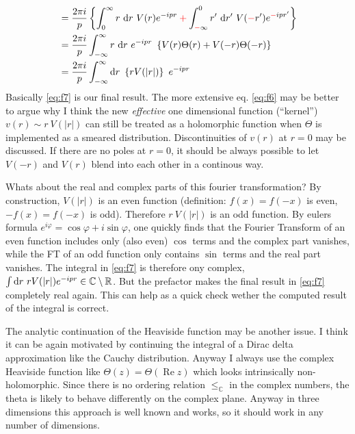 \documentclass[10pt,a4paper]{article}
\begin{document}
\begin{appendices}
\begin{subequations}
\begin{align}
&= \frac{2\pi i}p \left\{ \int_0^\infty r~\d r~V(r) e^{-ipr} \redplus \int_{\redmin \infty}^0 r'~\d r'~V(\redmin r') e^{\redmin i p r'} \right\}  \label{eq:f5} \\
&= \frac{2\pi i}p \int_{-\infty}^\infty r~\d r~ e^{-ipr}~
\left\{ V(r) \Theta(r) + V(-r) \Theta(-r) \right\} \label{eq:f6} \\
&= \frac{2\pi i}p \int_{-\infty}^\infty \d r~ \left\{ r V(|r|) \right\}~e^{-ipr} \label{eq:f7}
\end{align}
\end{subequations}
Basically \eqref{eq:f7} is our final result. The more extensive eq. \eqref{eq:f6} may be better to argue why I think the new {\it effective} one dimensional function (``kernel'') $v(r)\sim r~V(|r|)$ can still be treated as a holomorphic function when $\Theta$ is implemented as a smeared distribution. Discontinuities of $v(r)$ at $r=0$ may be discussed. If there are no poles at $r=0$, it should be always possible to let $V(-r)$ and $V(r)$ blend into each other in a continous way.

Whats about the real and complex parts of this fourier transformation? By construction, $V(|r|)$ is an even function (definition: $f(x)=f(-x)$ is even, $-f(x)=f(-x)$ is odd). Therefore $r~V(|r|)$ is an odd function. By eulers formula $e^{i\varphi} = \cos \varphi + i \sin \varphi$, one quickly finds that the Fourier Transform of an even function includes only (also even) $\cos$ terms and the complex part vanishes, while the FT of an odd function only contains $\sin$ terms and the real part vanishes. The integral in \eqref{eq:f7} is therefore ony complex, $\int \mathrm{d} r~rV(|r|)e^{-ipr} \in \mathbb{C} \setminus \mathbb{R}$. But the prefactor makes the final result in \eqref{eq:f7} completely real again. This can help as a quick check wether the computed result of the integral is correct.

The analytic continuation of the Heaviside function may be another issue. I think it can be again motivated by continuing the integral of a Dirac delta approximation like the Cauchy distribution. Anyway I always use the complex Heaviside function like $\Theta(z) = \Theta(\mathop{Re} z)$ which looks intrinsically non-holomorphic. Since there is no ordering relation $\leq_\mathbb{C}$ in the complex numbers, the theta is likely to behave differently on the complex plane. Anyway in three dimensions this approach is well known and works, so it should work in any number of dimensions.


\end{appendices}
\end{document}
